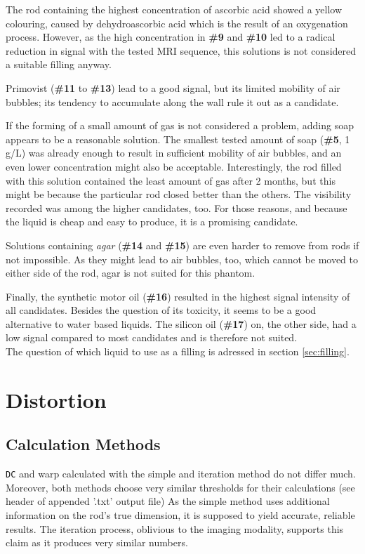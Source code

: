 The rod containing the highest concentration of ascorbic acid showed a yellow colouring, caused by dehydroascorbic acid which is the result of an oxygenation process.
However, as the high concentration in \textbf{\#9} and \textbf{\#10} led to a radical reduction in signal with the tested MRI sequence, this solutions is not considered a suitable filling anyway.

Primovist (\textbf{\#11} to \textbf{\#13}) lead to a good signal, but its limited mobility of air bubbles; its tendency to accumulate along the wall rule it out as a candidate.

If the forming of  a small amount of gas is not considered a problem, adding soap appears to be a reasonable solution.
The smallest tested amount of soap (\textbf{\#5}, 1 g/L) was already enough to result in sufficient mobility of air bubbles, and an even lower concentration might also be acceptable.
Interestingly, the rod filled with this solution contained the least amount of gas after 2 months, but this might be because the particular rod closed better than the others.
The visibility recorded was among the higher candidates, too.
For those reasons, and because the liquid is cheap and easy to produce, it is a promising candidate.

Solutions containing \textit{agar} (\textbf{\#14} and \textbf{\#15}) are even harder to remove from rods if not impossible.
As they might lead to air bubbles, too, which cannot be moved to either side of the rod, agar is not suited for this phantom.

Finally, the synthetic motor oil (\textbf{\#16}) resulted in the highest signal intensity of all candidates.
Besides the question of its toxicity, it seems to be a good alternative to water based liquids.
The silicon oil (\textbf{\#17}) on, the other side, had a low signal compared to most candidates and is therefore not suited. \\

The question of which liquid to use as a filling is adressed in section \ref{sec:filling}.


\section{Distortion}

\subsection{Calculation Methods}
\texttt{DC} and warp calculated with the simple and iteration method do not differ much.
Moreover, both methods choose very similar thresholds for their calculations (see header of appended '.txt' output file)
As the simple method uses additional information on the rod's true dimension, it is supposed to yield accurate, reliable results.
The iteration process, oblivious to the imaging modality, supports this claim as it produces very similar numbers.\\

